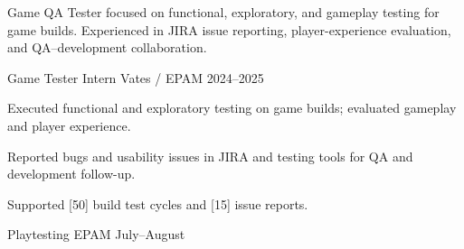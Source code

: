 \documentclass[10pt,a4paper]{../Awesome-CV/awesome-cv}
\begin{document}
\makecvheader[C]

\begin{cvparagraph}
 Game QA Tester focused on functional, exploratory, and gameplay testing for game builds. Experienced in JIRA issue reporting, player-experience evaluation, and QA--development collaboration.
\end{cvparagraph}

\begin{cventries}
  \cventry
    {Game Tester Intern}
    {Vates / EPAM}
    {}
    {2024--2025}
    {
      \begin{cvitems}
        \item {Executed functional and exploratory testing on game builds; evaluated gameplay and player experience.}
        \item {Reported bugs and usability issues in JIRA and testing tools for QA and development follow-up.}
        \item {Supported [50] build test cycles and [15] issue reports.}
      \end{cvitems}
    }
  \cventry
    {Playtesting}
    {EPAM}
    {}
    {July--August}
    {}
\end{cventries}

\begin{cvskills}
\end{cvskills}
\end{document}
